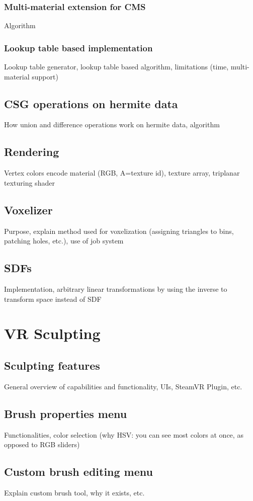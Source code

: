 \subsubsection{Multi-material extension for CMS}
Algorithm

\subsubsection{Lookup table based implementation}
Lookup table generator, lookup table based algorithm, limitations (time, multi-material support)

\subsection{CSG operations on hermite data}
How union and difference operations work on hermite data, algorithm

\subsection{Rendering}
Vertex colors encode material (RGB, A=texture id), texture array, triplanar texturing shader

\subsection{Voxelizer}
Purpose, explain method used for voxelization (assigning triangles to bins, patching holes, etc.), use of job system

\subsection{SDFs}
Implementation, arbitrary linear transformations by using the inverse to transform space instead of SDF

\section{VR Sculpting}

\subsection{Sculpting features}
General overview of capabilities and functionality, UIs, SteamVR Plugin, etc.

\subsection{Brush properties menu}
Functionalities, color selection (why HSV: you can see most colors at once, as opposed to RGB sliders)

\subsection{Custom brush editing menu}
Explain custom brush tool, why it exists, etc.